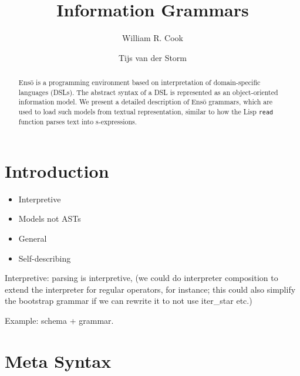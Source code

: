 \documentclass[a4paper]{article}
\def\enso{Ens\={o}\xspace}
\begin{document}
\title{Information Grammars} %
\author[1]{William R. Cook} 
\author[2]{Tijs van der Storm}
\maketitle

\begin{abstract}
  \enso is a programming environment based on interpretation of
  domain-specific languages (DSLs). The abstract syntax of a DSL is
  represented as an object-oriented information model. We present a
  detailed description of \enso grammars, which are used to load such
  models from textual representation, similar to how the Lisp
  \texttt{read} function parses text into s-expressions.
\end{abstract}

\section{Introduction}


\begin{itemize}
\item Interpretive
\item Models not ASTs
\item General
\item Self-describing
\end{itemize}

Interpretive: parsing is interpretive, (we could do interpreter
composition to extend the interpreter for regular operators, for
instance; this could also simplify the bootstrap grammar if we can
rewrite it to not use iter\_star etc.)

Example: schema + grammar.

\section{Meta Syntax}

\def\literal#1{\ensuremath{\text{\texttt{"}}#1\text{\texttt{"}}}}
\end{document}

